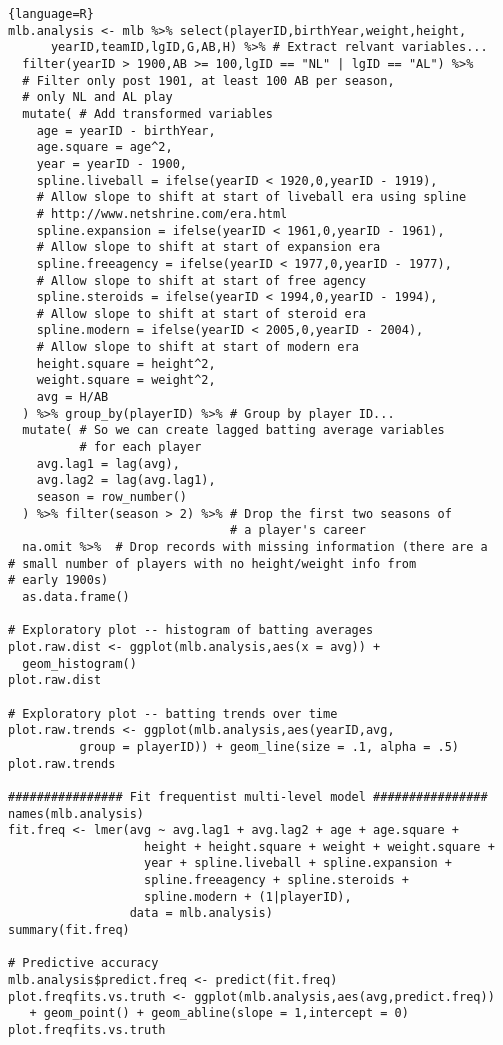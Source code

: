 \begin{lstlisting}{language=R}
mlb.analysis <- mlb %>% select(playerID,birthYear,weight,height,
      yearID,teamID,lgID,G,AB,H) %>% # Extract relvant variables...
  filter(yearID > 1900,AB >= 100,lgID == "NL" | lgID == "AL") %>% 
  # Filter only post 1901, at least 100 AB per season, 
  # only NL and AL play
  mutate( # Add transformed variables
    age = yearID - birthYear,
    age.square = age^2,
    year = yearID - 1900,
    spline.liveball = ifelse(yearID < 1920,0,yearID - 1919), 
    # Allow slope to shift at start of liveball era using spline 
    # http://www.netshrine.com/era.html
    spline.expansion = ifelse(yearID < 1961,0,yearID - 1961), 
    # Allow slope to shift at start of expansion era
    spline.freeagency = ifelse(yearID < 1977,0,yearID - 1977), 
    # Allow slope to shift at start of free agency
    spline.steroids = ifelse(yearID < 1994,0,yearID - 1994), 
    # Allow slope to shift at start of steroid era
    spline.modern = ifelse(yearID < 2005,0,yearID - 2004), 
    # Allow slope to shift at start of modern era
    height.square = height^2,
    weight.square = weight^2,
    avg = H/AB
  ) %>% group_by(playerID) %>% # Group by player ID...
  mutate( # So we can create lagged batting average variables 
          # for each player
    avg.lag1 = lag(avg),
    avg.lag2 = lag(avg.lag1),
    season = row_number()
  ) %>% filter(season > 2) %>% # Drop the first two seasons of 
                               # a player's career
  na.omit %>%  # Drop records with missing information (there are a 
# small number of players with no height/weight info from 
# early 1900s)
  as.data.frame()

# Exploratory plot -- histogram of batting averages
plot.raw.dist <- ggplot(mlb.analysis,aes(x = avg)) +
  geom_histogram()
plot.raw.dist

# Exploratory plot -- batting trends over time
plot.raw.trends <- ggplot(mlb.analysis,aes(yearID,avg, 
          group = playerID)) + geom_line(size = .1, alpha = .5) 
plot.raw.trends

################ Fit frequentist multi-level model ################
names(mlb.analysis)
fit.freq <- lmer(avg ~ avg.lag1 + avg.lag2 + age + age.square + 
                   height + height.square + weight + weight.square + 
                   year + spline.liveball + spline.expansion + 
                   spline.freeagency + spline.steroids + 
                   spline.modern + (1|playerID),
                 data = mlb.analysis)
summary(fit.freq)

# Predictive accuracy
mlb.analysis$predict.freq <- predict(fit.freq)
plot.freqfits.vs.truth <- ggplot(mlb.analysis,aes(avg,predict.freq)) 
   + geom_point() + geom_abline(slope = 1,intercept = 0)
plot.freqfits.vs.truth


\end{lstlisting}
